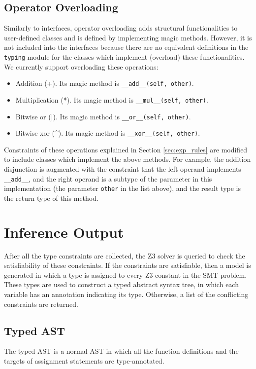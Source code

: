 \subsection{Operator Overloading}\label{sec:op_over}
Similarly to interfaces, operator overloading adds structural functionalities to user-defined classes and is defined by implementing magic methods. However, it is not included into the interfaces because there are no equivalent definitions in the \lstinline|typing| module for the classes which implement (overload) these functionalities. We currently support overloading these operations:
\begin{itemize}
	\item Addition (+). Its magic method is \lstinline|__add__(self, other)|.
	\item Multiplication (*). Its magic method is \lstinline|__mul__(self, other)|.
	\item Bitwise or (|). Its magic method is \lstinline|__or__(self, other)|.
	\item Bitwise xor (\textrm{\^}). Its magic method is \lstinline|__xor__(self, other)|.
\end{itemize}
Constraints of these operations explained in Section \ref{sec:exp_rules} are modified to include classes which implement the above methods. For example, the addition disjunction is augmented with the constraint that the left operand implements \lstinline|__add__|, and the right operand is a subtype of the parameter in this implementation (the parameter \lstinline|other| in the list above), and the result type is the return type of this method.
\section{Inference Output}
After all the type constraints are collected, the Z3 solver is queried to check the satisfiability of these constraints. If the constraints are satisfiable, then a model is generated in which a type is assigned to every Z3 constant in the SMT problem. These types are used to construct a typed abstract syntax tree, in which each variable has an annotation indicating its type. Otherwise, a list of the conflicting constraints are returned.
\subsection{Typed AST}
The typed AST is a normal AST in which all the function definitions and the targets of assignment statements are type-annotated.

